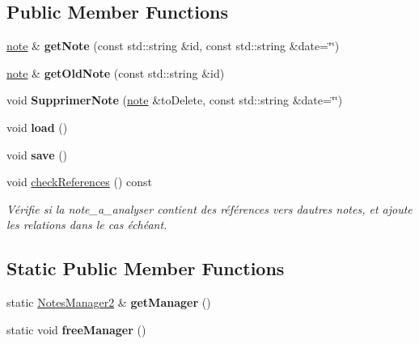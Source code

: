 \subsection*{Public Member Functions}
\begin{DoxyCompactItemize}
\item 
\mbox{\label{class_notes_manager2_a53819d123894c31bbbab66b3d0bf0ff0}} 
\hyperlink{classnote}{note} \& {\bfseries get\+Note} (const std\+::string \&id, const std\+::string \&date=\char`\"{}\char`\"{})
\item 
\mbox{\label{class_notes_manager2_ab3812fc5ddfbefa0a03fb2e1f958fd2e}} 
\hyperlink{classnote}{note} \& {\bfseries get\+Old\+Note} (const std\+::string \&id)
\item 
\mbox{\label{class_notes_manager2_ac020f8488f0f71f92de1e8131a64d943}} 
void {\bfseries Supprimer\+Note} (\hyperlink{classnote}{note} \&to\+Delete, const std\+::string \&date=\char`\"{}\char`\"{})
\item 
\mbox{\label{class_notes_manager2_a2248b5b1620b2039fdba9b3c6476c6cc}} 
void {\bfseries load} ()
\item 
\mbox{\label{class_notes_manager2_a03224a8a150d7d7a40a6633ab2afc7c0}} 
void {\bfseries save} ()
\item 
\mbox{\label{class_notes_manager2_a41ec18388f556565d78794ae042511b2}} 
void \hyperlink{class_notes_manager2_a41ec18388f556565d78794ae042511b2}{check\+References} () const
\begin{DoxyCompactList}\small\item\em Vérifie si la note\+\_\+a\+\_\+analyser contient des références vers d\textquotesingle{}autres notes, et ajoute les relations dans le cas échéant. \end{DoxyCompactList}\end{DoxyCompactItemize}
\subsection*{Static Public Member Functions}
\begin{DoxyCompactItemize}
\item 
\mbox{\label{class_notes_manager2_a392bc750d869bacbe50337531213f248}} 
static \hyperlink{class_notes_manager2}{Notes\+Manager2} \& {\bfseries get\+Manager} ()
\item 
\mbox{\label{class_notes_manager2_abdc16834a0e2ab7c8b3937674c725a0d}} 
static void {\bfseries free\+Manager} ()
\end{DoxyCompactItemize}
